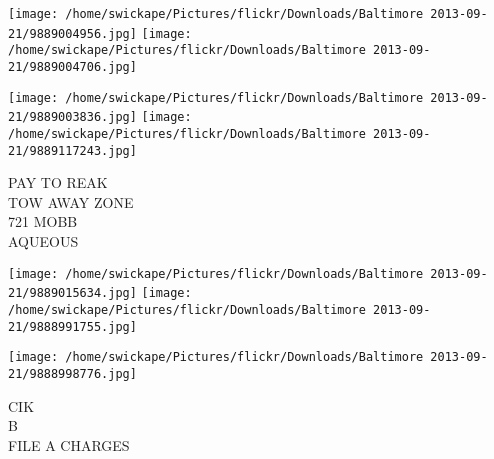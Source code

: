 \documentclass[10pt,letterpaper]{article}
\begin{document}
\texttt{[image: /home/swickape/Pictures/flickr/Downloads/Baltimore 2013-09-21/9889004956.jpg]}
\texttt{[image: /home/swickape/Pictures/flickr/Downloads/Baltimore 2013-09-21/9889004706.jpg]}

\texttt{[image: /home/swickape/Pictures/flickr/Downloads/Baltimore 2013-09-21/9889003836.jpg]}
\texttt{[image: /home/swickape/Pictures/flickr/Downloads/Baltimore 2013-09-21/9889117243.jpg]}

PAY TO REAK\\
TOW AWAY ZONE\\
721 MOBB\\
AQUEOUS
\pagebreak

\texttt{[image: /home/swickape/Pictures/flickr/Downloads/Baltimore 2013-09-21/9889015634.jpg]}
\texttt{[image: /home/swickape/Pictures/flickr/Downloads/Baltimore 2013-09-21/9888991755.jpg]}

\vspace{0.25in}
\texttt{[image: /home/swickape/Pictures/flickr/Downloads/Baltimore 2013-09-21/9888998776.jpg]}

CIK\\
B\\
FILE A CHARGES
\pagebreak
\end{document}
